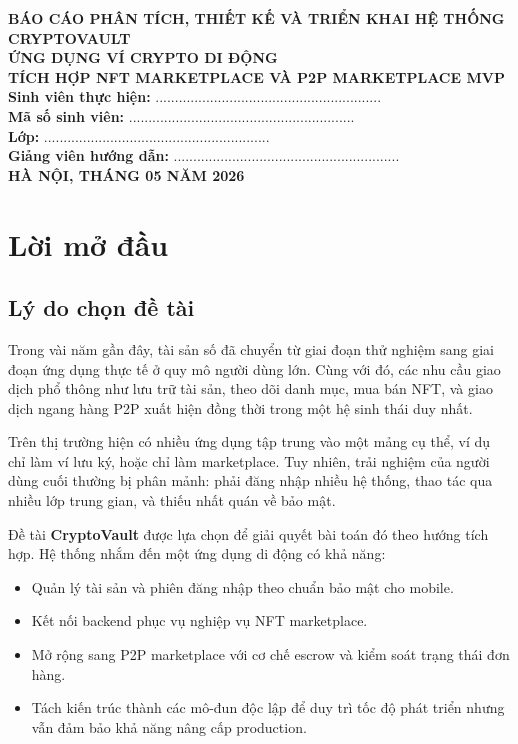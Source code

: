 \documentclass[a4paper,12pt]{report}
\begin{document}
\begin{titlepage}
    \begin{center}
        {\Large\textbf{BÁO CÁO PHÂN TÍCH, THIẾT KẾ VÀ TRIỂN KHAI HỆ THỐNG}}\\[0.8cm]
        {\LARGE\textbf{CRYPTOVAULT}}\\[0.4cm]
        {\Large\textbf{ỨNG DỤNG VÍ CRYPTO DI ĐỘNG}}\\[0.2cm]
        {\Large\textbf{TÍCH HỢP NFT MARKETPLACE VÀ P2P MARKETPLACE MVP}}\\[2.1cm]

        \textbf{Sinh viên thực hiện:} ..........................................................\\[0.3cm]
        \textbf{Mã số sinh viên:} ..........................................................\\[0.3cm]
        \textbf{Lớp:} ..........................................................\\[0.3cm]
        \textbf{Giảng viên hướng dẫn:} ..........................................................\\[2cm]

        \vfill
        \textbf{HÀ NỘI, THÁNG 05 NĂM 2026}
    \end{center}
\end{titlepage}

\tableofcontents
\newpage

\chapter{Lời mở đầu}

\section{Lý do chọn đề tài}
Trong vài năm gần đây, tài sản số đã chuyển từ giai đoạn thử nghiệm sang giai đoạn ứng dụng thực tế ở quy mô người dùng lớn. Cùng với đó, các nhu cầu giao dịch phổ thông như lưu trữ tài sản, theo dõi danh mục, mua bán NFT, và giao dịch ngang hàng P2P xuất hiện đồng thời trong một hệ sinh thái duy nhất.

Trên thị trường hiện có nhiều ứng dụng tập trung vào một mảng cụ thể, ví dụ chỉ làm ví lưu ký, hoặc chỉ làm marketplace. Tuy nhiên, trải nghiệm của người dùng cuối thường bị phân mảnh: phải đăng nhập nhiều hệ thống, thao tác qua nhiều lớp trung gian, và thiếu nhất quán về bảo mật.

Đề tài \textbf{CryptoVault} được lựa chọn để giải quyết bài toán đó theo hướng tích hợp. Hệ thống nhắm đến một ứng dụng di động có khả năng:
\begin{itemize}
    \item Quản lý tài sản và phiên đăng nhập theo chuẩn bảo mật cho mobile.
    \item Kết nối backend phục vụ nghiệp vụ NFT marketplace.
    \item Mở rộng sang P2P marketplace với cơ chế escrow và kiểm soát trạng thái đơn hàng.
    \item Tách kiến trúc thành các mô-đun độc lập để duy trì tốc độ phát triển nhưng vẫn đảm bảo khả năng nâng cấp production.
\end{itemize}
\end{document}
